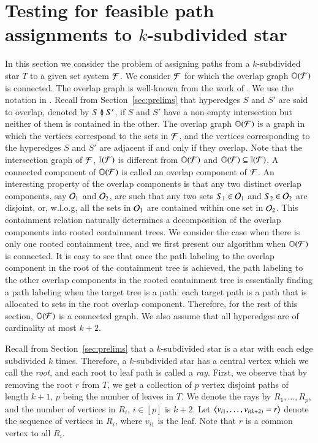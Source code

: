 \documentclass[synopsis,MS]             %
              {iitmdiss}
\begin{document}
\section{Testing for feasible path assignments to $k$-subdivided star}
\label{sec:ksubdivstar}
In this section we consider the problem of assigning paths from a
$k$-subdivided star $T$ to a given set system ${\cal F}$.  We consider
${\cal F}$ for which the overlap graph $\mathbb O({\cal F})$ is connected.  The
overlap graph is well-known from the work of
\cite{kklv10,nsnrs09,wlh02}.  We use the notation in
\cite{kklv10}. Recall from Section~\ref{sec:prelims} that hyperedges
$S$ and $S'$ are said to overlap, denoted by $S \between S'$, if $S$ and $S'$
have a non-empty intersection but neither of them is contained in the
other. The overlap graph $\mathbb O({\cal F})$ is a graph in which the vertices
correspond to the sets in ${\cal F}$, and the vertices corresponding to the
hyperedges $S$ and $S'$ are adjacent if and only if they overlap.  Note
that the intersection graph of ${\cal F}$, $\mathbb I({\cal F})$ is different from
$\mathbb O({\cal F})$ and $\mathbb O({\cal F}) \subseteq \mathbb I({\cal F})$.  A connected component
of $\mathbb O({\cal F})$ is called an overlap component of ${\cal F}$.  An interesting
property of the overlap components is that any two distinct overlap
components, say ${\cal O}_1$ and ${\cal O}_2$, are such that any two sets $S_1
\in {\cal O}_1$ and $S_2 \in {\cal O}_2$ are disjoint, or, w.l.o.g, all the sets
in ${\cal O}_1$ are contained within one set in ${\cal O}_2$.  This containment
relation naturally determines a decomposition of the overlap
components into rooted containment trees.  We consider the case when
there is only one rooted containment tree, and we first present our
algorithm when $\mathbb O({\cal F})$ is connected.  It is easy to see that once
the path labeling to the overlap component in the root of the
containment tree is achieved, the path labeling to the other overlap
components in the rooted containment tree is essentially finding a
path labeling when the target tree is a path: each target path is a
path that is allocated to sets in the root overlap component.
Therefore, for the rest of this section, $\mathbb O({\cal F})$ is a connected
graph. We also assume that all hyperedges are of cardinality at most
$k+2$.


\xnoindent
Recall from Section~\ref{sec:prelims} that a $k$-subdivided star is a
star with each edge subdivided $k$ times.  Therefore, a $k$-subdivided
star has a central vertex which we call the {\em root}, and each root
to leaf path is called a {\em ray}.  First, we observe that by
removing the root $r$ from $T$, we get a collection of $p$ vertex
disjoint paths of length $k+1$, $p$ being the number of leaves in $T$.
We denote the rays by $R_1, \ldots, R_p$, and the number of vertices in
$R_i$, $i \in [p]$ is $k+2$.  Let
$\left\langle v_{i1},\ldots,v_{i(k+2)}=r \right\rangle$ denote the sequence of vertices in
$R_i$, where $v_{i1}$ is the leaf. Note that $r$ is a common vertex to all $R_i$.
  
\end{document}
